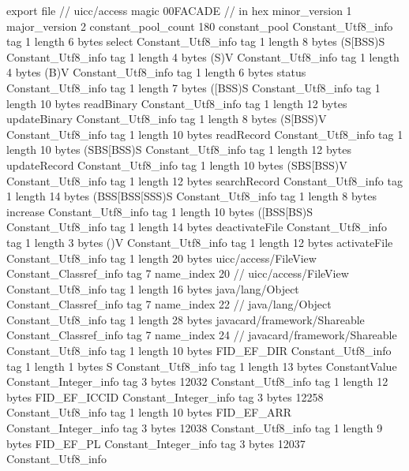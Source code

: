 export file {		// uicc/access
	magic	00FACADE		 // in hex
	minor_version	1
	major_version	2
	constant_pool_count	180
	constant_pool {
		Constant_Utf8_info {
			tag	1
			length	6
			bytes	select
		}
		Constant_Utf8_info {
			tag	1
			length	8
			bytes	(S[BSS)S
		}
		Constant_Utf8_info {
			tag	1
			length	4
			bytes	(S)V
		}
		Constant_Utf8_info {
			tag	1
			length	4
			bytes	(B)V
		}
		Constant_Utf8_info {
			tag	1
			length	6
			bytes	status
		}
		Constant_Utf8_info {
			tag	1
			length	7
			bytes	([BSS)S
		}
		Constant_Utf8_info {
			tag	1
			length	10
			bytes	readBinary
		}
		Constant_Utf8_info {
			tag	1
			length	12
			bytes	updateBinary
		}
		Constant_Utf8_info {
			tag	1
			length	8
			bytes	(S[BSS)V
		}
		Constant_Utf8_info {
			tag	1
			length	10
			bytes	readRecord
		}
		Constant_Utf8_info {
			tag	1
			length	10
			bytes	(SBS[BSS)S
		}
		Constant_Utf8_info {
			tag	1
			length	12
			bytes	updateRecord
		}
		Constant_Utf8_info {
			tag	1
			length	10
			bytes	(SBS[BSS)V
		}
		Constant_Utf8_info {
			tag	1
			length	12
			bytes	searchRecord
		}
		Constant_Utf8_info {
			tag	1
			length	14
			bytes	(BSS[BSS[SSS)S
		}
		Constant_Utf8_info {
			tag	1
			length	8
			bytes	increase
		}
		Constant_Utf8_info {
			tag	1
			length	10
			bytes	([BSS[BS)S
		}
		Constant_Utf8_info {
			tag	1
			length	14
			bytes	deactivateFile
		}
		Constant_Utf8_info {
			tag	1
			length	3
			bytes	()V
		}
		Constant_Utf8_info {
			tag	1
			length	12
			bytes	activateFile
		}
		Constant_Utf8_info {
			tag	1
			length	20
			bytes	uicc/access/FileView
		}
		Constant_Classref_info {
			tag	7
			name_index	20		// uicc/access/FileView
		}
		Constant_Utf8_info {
			tag	1
			length	16
			bytes	java/lang/Object
		}
		Constant_Classref_info {
			tag	7
			name_index	22		// java/lang/Object
		}
		Constant_Utf8_info {
			tag	1
			length	28
			bytes	javacard/framework/Shareable
		}
		Constant_Classref_info {
			tag	7
			name_index	24		// javacard/framework/Shareable
		}
		Constant_Utf8_info {
			tag	1
			length	10
			bytes	FID_EF_DIR
		}
		Constant_Utf8_info {
			tag	1
			length	1
			bytes	S
		}
		Constant_Utf8_info {
			tag	1
			length	13
			bytes	ConstantValue
		}
		Constant_Integer_info {
			tag	3
			bytes	12032
		}
		Constant_Utf8_info {
			tag	1
			length	12
			bytes	FID_EF_ICCID
		}
		Constant_Integer_info {
			tag	3
			bytes	12258
		}
		Constant_Utf8_info {
			tag	1
			length	10
			bytes	FID_EF_ARR
		}
		Constant_Integer_info {
			tag	3
			bytes	12038
		}
		Constant_Utf8_info {
			tag	1
			length	9
			bytes	FID_EF_PL
		}
		Constant_Integer_info {
			tag	3
			bytes	12037
		}
		Constant_Utf8_info {
}}}
